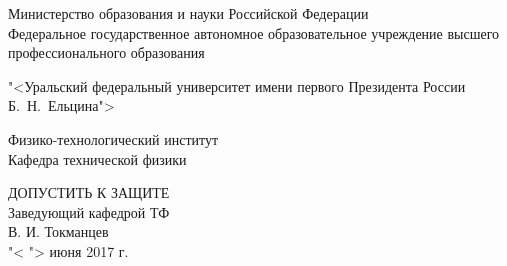 \begin{titlepage}
\begin{center}

	\begin{normalsize}
		{
			\noindent Министерство образования и науки Российской Федерации\\
			\noindent Федеральное государственное автономное образовательное учреждение высшего профессионального образования\\
		}
	\end{normalsize}
	
	\par \vspace{0.2cm}

	{

		\noindent "<Уральский федеральный университет имени первого Президента России Б.~Н.~Ельцина">\\
	}
	\noindent Физико-технологический институт \\
	\noindent Кафедра технической физики \\

	\par \vspace{1cm}

	\hfill\begin{minipage}{.45\textwidth}
		\begin{large}
			\begin{raggedleft}
				ДОПУСТИТЬ К ЗАЩИТЕ\\
				Заведующий кафедрой ТФ \\
				\underline{\hspace{2cm}} В. И. Токманцев \\
				"< \underline{\hspace{1cm}} "> июня 2017 г. \\
			\end{raggedleft}
		\end{large}
	\end{minipage}


\end{center}
\end{titlepage}
